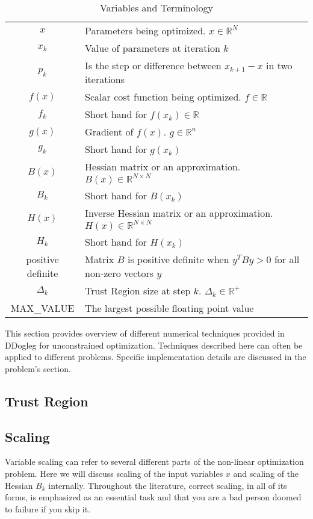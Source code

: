 \documentclass[peerreview,compsoc,onecolumn]{IEEEtran}
\newcommand{\R}{\mathbb{R}}
\begin{document}
\begin{table}[h]
\centering
\caption{Variables and Terminology}
\begin{tabular}{cl}
$x$ & Parameters being optimized. $x \in \R^N$ \\
$x_k$ & Value of parameters at iteration $k$ \\
$p_k$ & Is the step or difference between $x_{k+1}-x$ in two iterations \\
$f(x)$ & Scalar cost function being optimized. $f \in \R$ \\
$f_k$ & Short hand for $f(x_k) \in \R $ \\
$g(x)$ & Gradient of $f(x)$. $g \in \R^n$ \\
$g_k$ & Short hand for $g(x_k)$ \\
$B(x)$ & Hessian matrix or an approximation. $B(x) \in \R^{N \times N}$ \\ 
$B_k$ & Short hand for $B(x_k)$ \\
$H(x)$ & Inverse Hessian matrix or an approximation. $H(x) \in \R^{N \times N}$  \\ 
$H_k$ & Short hand for $H(x_k)$ \\
positive definite & Matrix $B$ is positive definite when $y^T B y > 0$ for all non-zero vectors $y$  \\
$\Delta_k$ & Trust Region size at step $k$. $\Delta_k \in \R^{+}$\\
MAX\_VALUE & The largest possible floating point value
\end{tabular}
\end{table}

This section provides overview of different numerical techniques provided in DDogleg for unconstrained optimization. Techniques described here can often be applied to different problems. Specific implementation details are discussed in the problem's section.

\subsection{Trust Region}



\subsection{Scaling}
\label{section:scaling}

Variable scaling can refer to several different parts of the non-linear optimization problem. Here we will discuss scaling of the input variables $x$ and scaling of the Hessian $B_k$ internally. Throughout the literature, correct scaling, in all of its forms, is emphasized as an essential task and that you are a bad person doomed to failure if you skip it. 
\end{document}

